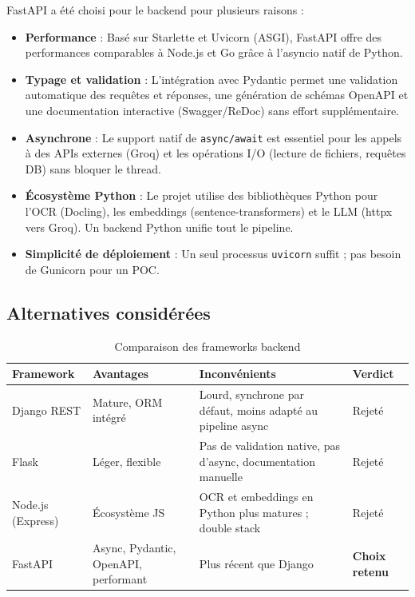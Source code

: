 \documentclass[11pt,a4paper]{report}
\begin{document}
FastAPI a été choisi pour le backend pour plusieurs raisons :

\begin{itemize}[leftmargin=*]
  \item \textbf{Performance} : Basé sur Starlette et Uvicorn (ASGI), FastAPI offre des performances comparables à Node.js et Go grâce à l'asyncio natif de Python.
  \item \textbf{Typage et validation} : L'intégration avec Pydantic permet une validation automatique des requêtes et réponses, une génération de schémas OpenAPI et une documentation interactive (Swagger/ReDoc) sans effort supplémentaire.
  \item \textbf{Asynchrone} : Le support natif de \texttt{async/await} est essentiel pour les appels à des APIs externes (Groq) et les opérations I/O (lecture de fichiers, requêtes DB) sans bloquer le thread.
  \item \textbf{Écosystème Python} : Le projet utilise des bibliothèques Python pour l'OCR (Docling), les embeddings (sentence-transformers) et le LLM (httpx vers Groq). Un backend Python unifie tout le pipeline.
  \item \textbf{Simplicité de déploiement} : Un seul processus \texttt{uvicorn} suffit ; pas besoin de Gunicorn pour un POC.
\end{itemize}

\subsection{Alternatives considérées}

\begin{table}[H]
  \centering
  \caption{Comparaison des frameworks backend}
  \small
  \begin{tabular}{@{}lp{3cm}p{3cm}p{3cm}@{}}
    \toprule
    \textbf{Framework} & \textbf{Avantages} & \textbf{Inconvénients} & \textbf{Verdict} \\
    \midrule
    Django REST & Mature, ORM intégré & Lourd, synchrone par défaut, moins adapté au pipeline async & Rejeté \\
    Flask & Léger, flexible & Pas de validation native, pas d'async, documentation manuelle & Rejeté \\
    Node.js (Express) & Écosystème JS & OCR et embeddings en Python plus matures ; double stack & Rejeté \\
    FastAPI & Async, Pydantic, OpenAPI, performant & Plus récent que Django & \textbf{Choix retenu} \\
    \bottomrule
  \end{tabular}
\end{table}
\end{document}
